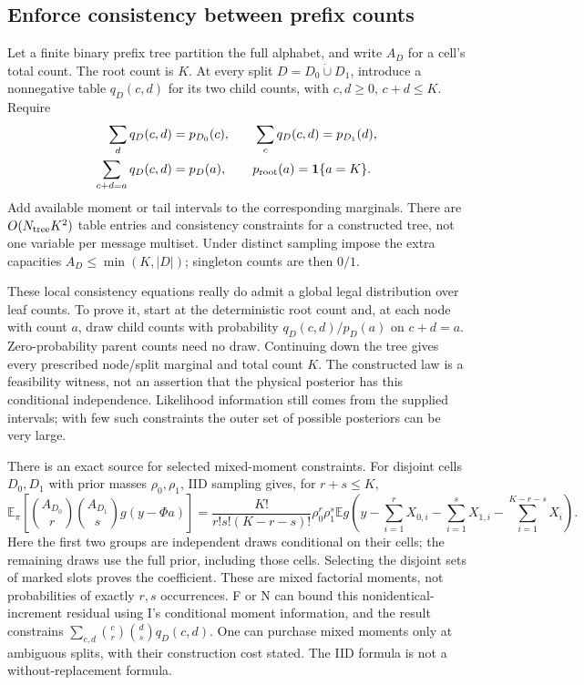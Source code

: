 \documentclass[10pt,a4paper]{article}
\newcommand{\E}{\mathbb E}
\newcommand{\ind}{\mathbf 1}
\begin{document}
\subsection{Enforce consistency between prefix counts}
Let a finite binary prefix tree partition the full alphabet, and write $A_D$ for a cell's total count.
The root count is $K$. At every split $D=D_0\mathbin{\dot\cup}D_1$, introduce a nonnegative table
$q_D(c,d)$ for its two child counts, with $c,d\geq0$, $c+d\leq K$. Require
\begin{equation}
 \begin{split}
 \sum_d q_D(c,d)&=p_{D_0}(c),\qquad
 \sum_c q_D(c,d)=p_{D_1}(d),\\
 \sum_{c+d=a}q_D(c,d)&=p_D(a),\qquad p_{\rm root}(a)=\ind\{a=K\}.
 \end{split}
 \label{eq:prefix-count-consistency}
\end{equation}
Add available moment or tail intervals to the corresponding marginals.
There are $O(N_{\rm tree}K^2)$ table entries and consistency constraints for a constructed tree,
not one variable per message multiset. Under distinct sampling impose the extra capacities
$A_D\leq\min(K,|D|)$; singleton counts are then $0/1$.

These local consistency equations really do admit a global legal distribution over leaf counts.
To prove it, start at the deterministic root count and, at each node with count $a$, draw child counts
with probability $q_D(c,d)/p_D(a)$ on $c+d=a$. Zero-probability parent counts need no draw.
Continuing down the tree gives every prescribed node/split marginal and total count $K$.
The constructed law is a feasibility witness, not an assertion that the physical posterior has this
conditional independence. Likelihood information still comes from the supplied intervals; with few such
constraints the outer set of possible posteriors can be very large.

There is an exact source for selected mixed-moment constraints. For disjoint cells $D_0,D_1$ with
prior masses $\rho_0,\rho_1$, IID sampling gives, for $r+s\leq K$,
\begin{equation}
 \E_\pi\!\left[\binom{A_{D_0}}r\binom{A_{D_1}}s g(y-\Phi a)\right]
 =\frac{K!}{r!s!(K-r-s)!}\rho_0^r\rho_1^s
 \E g\!\left(y-\sum_{i=1}^rX_{0,i}-\sum_{i=1}^sX_{1,i}
                   -\sum_{i=1}^{K-r-s}X_i\right).
 \label{eq:mixed-prefix-factorial}
\end{equation}
Here the first two groups are independent draws conditional on their cells; the remaining draws use
the full prior, including those cells. Selecting the disjoint sets of marked slots proves the coefficient.
These are mixed factorial moments, not probabilities of exactly $r,s$ occurrences.
F or N can bound this nonidentical-increment residual using I's conditional moment information, and the
result constrains $\sum_{c,d}\binom cr\binom ds q_D(c,d)$.
One can purchase mixed moments only at ambiguous splits, with their construction cost stated.
The IID formula is not a without-replacement formula.
\end{document}
